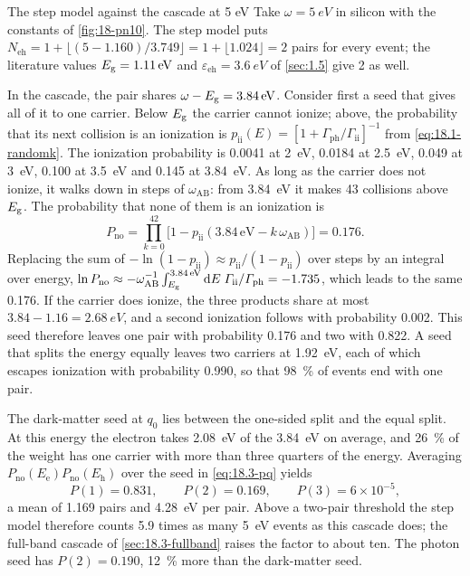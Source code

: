 \begin{workedexample}{The step model against the cascade at 5 eV}\label{we:18-step5}
Take $\omega = \SI{5}{eV}$ in silicon with the constants of \cref{fig:18-pn10}. The step model puts $N_{\mathrm{eh}} = 1 + \lfloor(5 - 1.160)/3.749\rfloor = 1 + \lfloor1.024\rfloor = 2$ pairs for every event; the literature values $E_{\mathrm{g}} = \SI{1.11}{eV}$ and $\varepsilon_{\mathrm{eh}} = \SI{3.6}{eV}$ of \cref{sec:1.5} give 2 as well.

In the cascade, the pair shares $\omega - E_{\mathrm{g}} = \SI{3.84}{eV}$. Consider first a seed that gives all of it to one carrier. Below $E_{\mathrm{g}}$ the carrier cannot ionize; above, the probability that its next collision is an ionization is $p_{\mathrm{ii}}(E) = [1 + \varGamma_{\mathrm{ph}}/\varGamma_{\mathrm{ii}}]^{-1}$ from \cref{eq:18.1-randomk}. The ionization probability is 0.0041 at \SI{2}{eV}, 0.0184 at \SI{2.5}{eV}, 0.049 at \SI{3}{eV}, 0.100 at \SI{3.5}{eV} and 0.145 at \SI{3.84}{eV}. As long as the carrier does not ionize, it walks down in steps of $\omega_{\mathrm{AB}}$: from \SI{3.84}{eV} it makes 43 collisions above $E_{\mathrm{g}}$. The probability that none of them is an ionization is
\begin{equation*}
  P_{\mathrm{no}} = \prod_{k=0}^{42}\bigl[1 - p_{\mathrm{ii}}(3.84\,\mathrm{eV} - k\,\omega_{\mathrm{AB}})\bigr] = 0.176 .
\end{equation*}
Replacing the sum of $-\ln(1 - p_{\mathrm{ii}}) \approx p_{\mathrm{ii}}/(1 - p_{\mathrm{ii}})$ over steps by an integral over energy, $\ln P_{\mathrm{no}} \approx -\omega_{\mathrm{AB}}^{-1}\int_{E_{\mathrm{g}}}^{3.84\,\mathrm{eV}}\mathrm{d} E\;\varGamma_{\mathrm{ii}}/\varGamma_{\mathrm{ph}} = -1.735$, which leads to the same 0.176. If the carrier does ionize, the three products share at most $3.84 - 1.16 = \SI{2.68}{eV}$, and a second ionization follows with probability 0.002. This seed therefore leaves one pair with probability 0.176 and two with 0.822. A seed that splits the energy equally leaves two carriers at \SI{1.92}{eV}, each of which escapes ionization with probability 0.990, so that \SI{98}{\percent} of events end with one pair.

The dark-matter seed at $q_0$ lies between the one-sided split and the equal split. At this energy the electron takes \SI{2.08}{eV} of the \SI{3.84}{eV} on average, and \SI{26}{\percent} of the weight has one carrier with more than three quarters of the energy. Averaging $P_{\mathrm{no}}(E_{\mathrm{e}})P_{\mathrm{no}}(E_{\mathrm{h}})$ over the seed in \cref{eq:18.3-pq} yields
\begin{equation*}
  P(1) = 0.831 , \qquad P(2) = 0.169 , \qquad P(3) = 6\times10^{-5} ,
\end{equation*}
a mean of 1.169 pairs and \SI{4.28}{eV} per pair. Above a two-pair threshold the step model therefore counts 5.9 times as many \SI{5}{eV} events as this cascade does; the full-band cascade of \cref{sec:18.3-fullband} raises the factor to about ten. The photon seed has $P(2) = 0.190$, \SI{12}{\percent} more than the dark-matter seed.
\end{workedexample}

